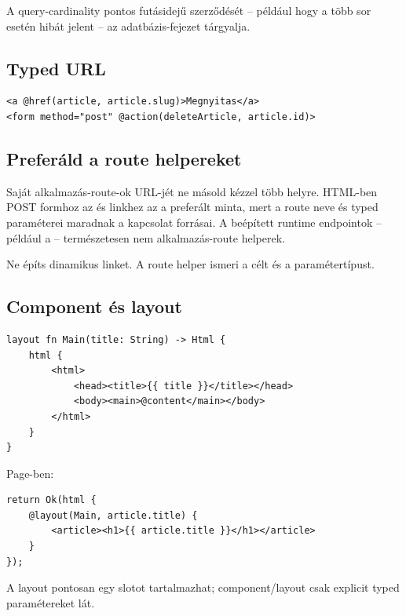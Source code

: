 A query-cardinality pontos futásidejű szerződését -- például hogy a  több sor esetén hibát jelent -- az adatbázis-fejezet tárgyalja.

\subsection*{Typed URL}

\begin{lstlisting}[language=RWLang]
<a @href(article, article.slug)>Megnyitas</a>
<form method="post" @action(deleteArticle, article.id)>
\end{lstlisting}

\subsection*{Preferáld a route helpereket}

Saját alkalmazás-route-ok URL-jét ne másold kézzel több helyre. HTML-ben POST formhoz az  és linkhez az  a preferált minta, mert a route neve és typed paraméterei maradnak a kapcsolat forrásai. A beépített runtime endpointok -- például a  -- természetesen nem alkalmazás-route helperek.


Ne építs dinamikus  linket. A route helper ismeri a célt és a paramétertípust.

\subsection*{Component és layout}

\begin{lstlisting}[language=RWLang]
layout fn Main(title: String) -> Html {
    html {
        <html>
            <head><title>{{ title }}</title></head>
            <body><main>@content</main></body>
        </html>
    }
}
\end{lstlisting}

Page-ben:

\begin{lstlisting}[language=RWLang]
return Ok(html {
    @layout(Main, article.title) {
        <article><h1>{{ article.title }}</h1></article>
    }
});
\end{lstlisting}

A layout pontosan egy  slotot tartalmazhat; component/layout csak explicit typed paramétereket lát.
